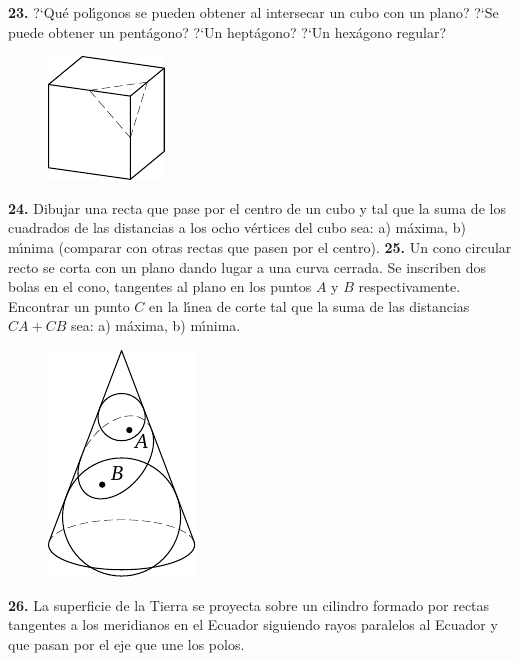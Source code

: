 \documentclass[12pt]{article}  %
\begin{document}
\noindent
{\bf 23.} ?`Qu\'e pol\'{\i}gonos se pueden obtener al intersecar un cubo con un plano? ?`Se puede obtener un pent\'agono? ?`Un hept\'agono? 
?`Un hex\'agono regular?
\begin{figure}[h]
\centering
\footnotesize
\includegraphics[scale=1]{taskbook-7}
\end{figure}
\newline\newline\quad
{\bf 24.} Dibujar una recta que pase por el centro de un cubo y tal que la suma de los cuadrados de las distancias a los ocho v\'ertices del cubo sea:
\newline
a) m\'axima,
\newline
b) m\'{\i}nima (comparar con otras rectas que pasen por el centro).
\newline\newline\quad
{\bf 25.} Un cono circular recto se corta con un plano dando lugar a una curva cerrada. Se inscriben dos bolas en el cono, tangentes al plano en los puntos $A$ y $B$ respectivamente. 
Encontrar un punto $C$ en la l\'{\i}nea de corte tal que la suma de las distancias $CA + CB$ sea:
 a) m\'axima, b) m\'{\i}nima.
\begin{figure}[h]
\centering
\footnotesize
\includegraphics[scale=1]{taskbook-9}
\end{figure}
\newline\newline\quad
{\bf 26.} La superficie de la Tierra se proyecta sobre un cilindro formado por rectas tangentes a los meridianos en el Ecuador siguiendo rayos paralelos al Ecuador y que pasan por el eje que une los polos.
\end{document}
